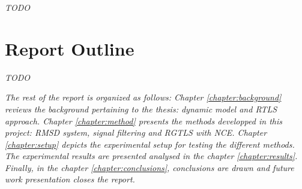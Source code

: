 \documentclass[/home/francois/latex/report/main.tex]{subfiles}
\begin{document}
\textit{TODO}

{\it

}


\section{Report Outline}

\textit{TODO}

{\it
The rest of the report is organized as follows: Chapter \ref{chapter:background} reviews the background pertaining to the thesis: dynamic model and \ac{RTLS} approach. Chapter \ref{chapter:method} presents the methods developped in this project: \ac{RMSD} system, signal filtering and \ac{RGTLS} with \ac{NCE}. Chapter \ref{chapter:setup} depicts the experimental setup for testing the different methods. The experimental results are presented analysed in the chapter \ref{chapter:results}. Finally, in the chapter \ref{chapter:conclusions}, conclusions are drawn and future work presentation closes the report.
}
\end{document}
